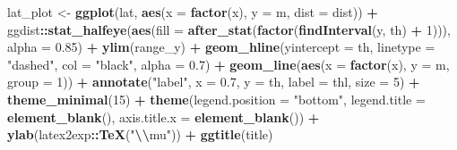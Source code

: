 \documentclass[
  man,floatsintext]{apa6}
\newenvironment{Shaded}{\begin{snugshade}}{\end{snugshade}}
\newcommand{\AttributeTok}[1]{\textcolor[rgb]{0.13,0.29,0.53}{#1}}
\newcommand{\DecValTok}[1]{\textcolor[rgb]{0.00,0.00,0.81}{#1}}
\newcommand{\FloatTok}[1]{\textcolor[rgb]{0.00,0.00,0.81}{#1}}
\newcommand{\FunctionTok}[1]{\textcolor[rgb]{0.13,0.29,0.53}{\textbf{#1}}}
\newcommand{\NormalTok}[1]{#1}
\newcommand{\OtherTok}[1]{\textcolor[rgb]{0.56,0.35,0.01}{#1}}
\newcommand{\SpecialCharTok}[1]{\textcolor[rgb]{0.81,0.36,0.00}{\textbf{#1}}}
\newcommand{\StringTok}[1]{\textcolor[rgb]{0.31,0.60,0.02}{#1}}
\begin{document}
\begin{Shaded}
\begin{Highlighting}[]
\NormalTok{  lat\_plot }\OtherTok{\textless{}{-}} \FunctionTok{ggplot}\NormalTok{(lat,}
         \FunctionTok{aes}\NormalTok{(}\AttributeTok{x =} \FunctionTok{factor}\NormalTok{(x), }\AttributeTok{y =}\NormalTok{ m, }\AttributeTok{dist =}\NormalTok{ dist)) }\SpecialCharTok{+}
\NormalTok{    ggdist}\SpecialCharTok{::}\FunctionTok{stat\_halfeye}\NormalTok{(}\FunctionTok{aes}\NormalTok{(}\AttributeTok{fill =} \FunctionTok{after\_stat}\NormalTok{(}\FunctionTok{factor}\NormalTok{(}\FunctionTok{findInterval}\NormalTok{(y, th) }\SpecialCharTok{+} \DecValTok{1}\NormalTok{))),}
                 \AttributeTok{alpha =} \FloatTok{0.85}\NormalTok{) }\SpecialCharTok{+}
    \FunctionTok{ylim}\NormalTok{(range\_y) }\SpecialCharTok{+}
    \FunctionTok{geom\_hline}\NormalTok{(}\AttributeTok{yintercept =}\NormalTok{ th, }\AttributeTok{linetype =} \StringTok{"dashed"}\NormalTok{, }\AttributeTok{col =} \StringTok{"black"}\NormalTok{, }\AttributeTok{alpha =} \FloatTok{0.7}\NormalTok{) }\SpecialCharTok{+}
    \FunctionTok{geom\_line}\NormalTok{(}\FunctionTok{aes}\NormalTok{(}\AttributeTok{x =} \FunctionTok{factor}\NormalTok{(x), }\AttributeTok{y =}\NormalTok{ m, }\AttributeTok{group =} \DecValTok{1}\NormalTok{)) }\SpecialCharTok{+}
    \FunctionTok{annotate}\NormalTok{(}\StringTok{"label"}\NormalTok{, }\AttributeTok{x =} \FloatTok{0.7}\NormalTok{, }\AttributeTok{y =}\NormalTok{ th, }\AttributeTok{label =}\NormalTok{ thl, }\AttributeTok{size =} \DecValTok{5}\NormalTok{) }\SpecialCharTok{+}
    \FunctionTok{theme\_minimal}\NormalTok{(}\DecValTok{15}\NormalTok{) }\SpecialCharTok{+}
    \FunctionTok{theme}\NormalTok{(}\AttributeTok{legend.position =} \StringTok{"bottom"}\NormalTok{,}
          \AttributeTok{legend.title =} \FunctionTok{element\_blank}\NormalTok{(),}
          \AttributeTok{axis.title.x =} \FunctionTok{element\_blank}\NormalTok{()) }\SpecialCharTok{+}
    \FunctionTok{ylab}\NormalTok{(latex2exp}\SpecialCharTok{::}\FunctionTok{TeX}\NormalTok{(}\StringTok{"}\SpecialCharTok{\textbackslash{}\textbackslash{}}\StringTok{mu"}\NormalTok{)) }\SpecialCharTok{+}
    \FunctionTok{ggtitle}\NormalTok{(title)}
  

\end{Highlighting}
\end{Shaded}
\end{document}
